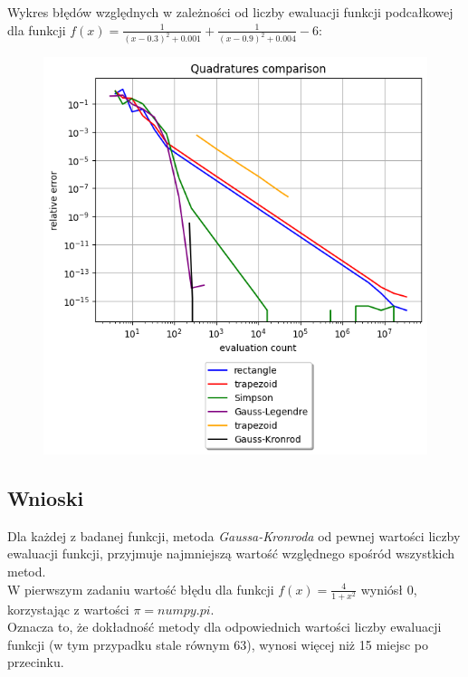 \documentclass{article}
\begin{document}
Wykres błędów względnych w zależności od liczby ewaluacji
funkcji podcałkowej dla funkcji \space
$f(x) = \frac{1}{(x-0.3)^2 + 0.001} + \frac{1}{(x-0.9)^2 + 0.004} - 6$:
\begin{figure}[H]
  \includegraphics[width=\linewidth]{figures/quad_h.png}
\end{figure}


\subsection*{Wnioski}
\null\quad Dla każdej z badanej funkcji, metoda \textit{Gaussa-Kronroda} od
pewnej wartości liczby ewaluacji funkcji, przyjmuje najmniejszą wartość
względnego spośród wszystkich metod. \\
\null\quad W pierwszym zadaniu wartość błędu dla funkcji
$f(x)=\frac{4}{1+x^2}$ wyniósł 0, korzystając z wartości $\pi = numpy.pi$.\\
Oznacza to, że dokładność metody dla odpowiednich wartości
liczby ewaluacji funkcji (w tym przypadku stale równym 63), 
wynosi więcej niż 15 miejsc po przecinku.
\end{document}
